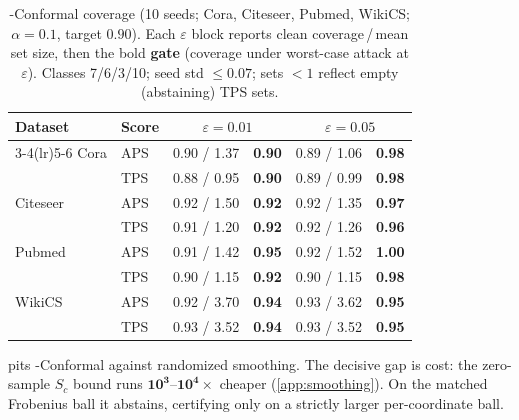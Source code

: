 \begin{table}[t]\centering\footnotesize\setlength{\tabcolsep}{4pt}
\caption{\AEGIS-Conformal coverage (10 seeds; Cora, Citeseer, Pubmed, WikiCS; $\alpha{=}0.1$, target $0.90$). Each $\varepsilon$ block reports clean coverage\,/\,mean set size, then the bold \textbf{gate} (coverage under worst-case attack at $\varepsilon$). Classes 7/6/3/10; seed std ${\leq}0.07$; sets ${<}1$ reflect empty (abstaining) TPS sets.}
\label{tab:conformal}
\begin{tabular*}{\columnwidth}{@{\extracolsep{\fill}}ll cc cc@{}}
\toprule
Dataset & Score & \multicolumn{2}{c}{$\varepsilon{=}0.01$} & \multicolumn{2}{c}{$\varepsilon{=}0.05$} \\
\cmidrule(lr){3-4}\cmidrule(lr){5-6}
Cora     & APS & 0.90 / 1.37 & \textbf{0.90} & 0.89 / 1.06 & \textbf{0.98} \\
         & TPS & 0.88 / 0.95 & \textbf{0.90} & 0.89 / 0.99 & \textbf{0.98} \\
\addlinespace
Citeseer & APS & 0.92 / 1.50 & \textbf{0.92} & 0.92 / 1.35 & \textbf{0.97} \\
         & TPS & 0.91 / 1.20 & \textbf{0.92} & 0.92 / 1.26 & \textbf{0.96} \\
\addlinespace
Pubmed   & APS & 0.91 / 1.42 & \textbf{0.95} & 0.92 / 1.52 & \textbf{1.00} \\
         & TPS & 0.90 / 1.15 & \textbf{0.92} & 0.90 / 1.15 & \textbf{0.98} \\
\addlinespace
WikiCS   & APS & 0.92 / 3.70 & \textbf{0.94} & 0.93 / 3.62 & \textbf{0.95} \\
         & TPS & 0.93 / 3.52 & \textbf{0.94} & 0.93 / 3.52 & \textbf{0.95} \\
\bottomrule
\end{tabular*}
\end{table}

 pits \AEGIS-Conformal against randomized smoothing. The decisive gap is cost: the zero-sample $S_c$ bound runs $\mathbf{10^3}$--$\mathbf{10^4\times}$ cheaper (\cref{app:smoothing}). On the matched Frobenius ball it abstains, certifying only on a strictly larger per-coordinate ball.

